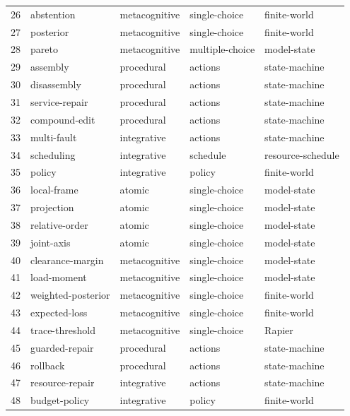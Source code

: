\begin{center}
\begin{tabular}{rllll}
26 & abstention & metacognitive & single-choice & finite-world \\
27 & posterior & metacognitive & single-choice & finite-world \\
28 & pareto & metacognitive & multiple-choice & model-state \\
29 & assembly & procedural & actions & state-machine \\
30 & disassembly & procedural & actions & state-machine \\
31 & service-repair & procedural & actions & state-machine \\
32 & compound-edit & procedural & actions & state-machine \\
33 & multi-fault & integrative & actions & state-machine \\
34 & scheduling & integrative & schedule & resource-schedule \\
35 & policy & integrative & policy & finite-world \\
36 & local-frame & atomic & single-choice & model-state \\
37 & projection & atomic & single-choice & model-state \\
38 & relative-order & atomic & single-choice & model-state \\
39 & joint-axis & atomic & single-choice & model-state \\
40 & clearance-margin & metacognitive & single-choice & model-state \\
41 & load-moment & metacognitive & single-choice & model-state \\
42 & weighted-posterior & metacognitive & single-choice & finite-world \\
43 & expected-loss & metacognitive & single-choice & finite-world \\
44 & trace-threshold & metacognitive & single-choice & Rapier \\
45 & guarded-repair & procedural & actions & state-machine \\
46 & rollback & procedural & actions & state-machine \\
47 & resource-repair & integrative & actions & state-machine \\
48 & budget-policy & integrative & policy & finite-world \\
\bottomrule\end{tabular}\end{center}
\clearpage
